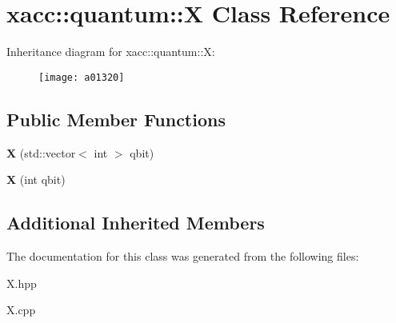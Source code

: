 \hypertarget{a01320}{}\section{xacc\+:\+:quantum\+:\+:X Class Reference}
\label{a01320}
Inheritance diagram for xacc\+:\+:quantum\+:\+:X\+:\begin{figure}[H]
\begin{center}
\leavevmode
\texttt{[image: a01320]}
\end{center}
\end{figure}
\subsection*{Public Member Functions}
\begin{DoxyCompactItemize}
\item 
\mbox{\label{a01320_aedc541a302602154847118f73b040510}} 
{\bfseries X} (std\+::vector$<$ int $>$ qbit)
\item 
\mbox{\label{a01320_a1159bd01929b59277b4524ccfcfd7440}} 
{\bfseries X} (int qbit)
\end{DoxyCompactItemize}
\subsection*{Additional Inherited Members}


The documentation for this class was generated from the following files\+:\begin{DoxyCompactItemize}
\item 
X.\+hpp\item 
X.\+cpp\end{DoxyCompactItemize}
